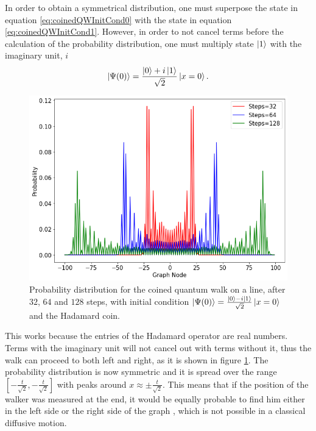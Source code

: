 \documentclass[../../dissertation.tex]{subfiles}
\begin{document}
In order to obtain a symmetrical distribution, one must superpose the state in
equation \ref{eq:coinedQWInitCond0} with the state in equation
\ref{eq:coinedQWInitCond1}. However, in order to not cancel terms before the
calculation of the probability distribution, one must multiply state $\ket{1}$
with the imaginary unit, $i$ 
\begin{equation}
	\ket{\Psi(0)} = \frac{\ket{0}+i\ket{1}}{\sqrt{2}}\ket{x=0}.
	\label{eq:12}
\end{equation}
\begin{figure}[!ht]
	\centering
	\includegraphics[scale=0.40]{img/CoinedQuantumWalk/CoinedMultiple_psi01_3264128}
	\caption{Probability distribution for the coined quantum walk on a line, after $32$, $64$ and $128$ steps, with initial condition $\ket{\Psi(0)}=\frac{\ket{0}-i\ket{1}}{\sqrt{2}}\ket{x=0}$ and the Hadamard coin.} 
	\label{fig:coinedQWDist01}
\end{figure}
This works because the entries of the Hadamard operator are real numbers. Terms
with the imaginary unit will not cancel out with terms without it, thus the
walk can proceed to both left and right, as it is shown in figure
\ref{fig:coinedQWDist01}.  The probability distribution is now symmetric and it
is spread over the range $[-\frac{t}{\sqrt{2}},-\frac{t}{\sqrt{2}}]$ with peaks
around $x \approx \pm \frac{t}{\sqrt{2}}$. This means that if the position of
the walker was measured at the end, it would be equally probable to find him
either in the left side or the right side of the graph , which is not possible
in a classical diffusive motion.\par 
\end{document}
